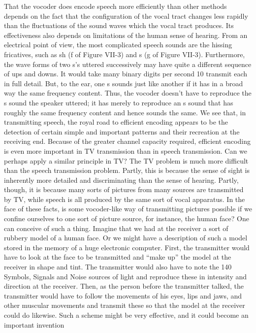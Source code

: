 {{{That the vocoder does encode speech more efficiently than other
methods depends on the fact that the configuration of the vocal
tract changes less rapidly than the fluctuations of the sound waves
which the vocal tract produces. Its effectiveness also depends on
limitations of the human sense of hearing.
From an electrical point of view, the most complicated speech
sounds are the hissing fricatives, such as sh (f of Figure VII-3) and
s (g of Figure VII-3). Furthermore, the wave forms of two s’s
uttered successively may have quite a different sequence of ups and
downs. It would take many binary digits per second 10 transmit
each in full detail. But, to the ear, one s sounds just like another
if it has in a broad way the same frequency content. Thus, the
vocoder doesn’t have to reproduce the s sound the speaker uttered;
it has merely to reproduce an s sound that has roughly the same
frequency content and hence sounds the same.
We see that, in transmitting speech, the royal road to efficient
encoding appears to be the detection of certain simple and important
patterns and their recreation at the receiving end. Because of
the greater channel capacity required, efficient encoding is even
more important in TV transmission than in speech transmission.
Can we perhaps apply a similar principle in TV?
The TV problem is much more difficult than the speech transmission
problem. Partly, this is because the sense of sight is inherently
more detailed and discriminating than the sense of hearing.
Partly, though, it is because many sorts of pictures from many
sources are transmitted by TV, while speech is all produced by the
same sort of vocal apparatus.
In the face of these facts, is some vocoder-like way of transmitting
pictures possible if we confine ourselves to one sort of
picture source, for instance, the human face?
One can conceive of such a thing. Imagine that we had at the
receiver a sort of rubbery model of a human face. Or we might have
a description of such a model stored in the memory of a huge
electronic computer. First, the transmitter would have to look at
the face to be transmitted and “make up” the model at the receiver
in shape and tint. The transmitter would also have to note the
140
Symbols, Signals and Noise
sources of light and reproduce these in intensity and direction at
the receiver. Then, as the person before the transmitter talked, the
transmitter would have to follow the movements of his eyes, lips
and jaws, and other muscular movements and transmit these so
that the model at the receiver could do likewise. Such a scheme
might be very effective, and it could become an important invention
}}}
